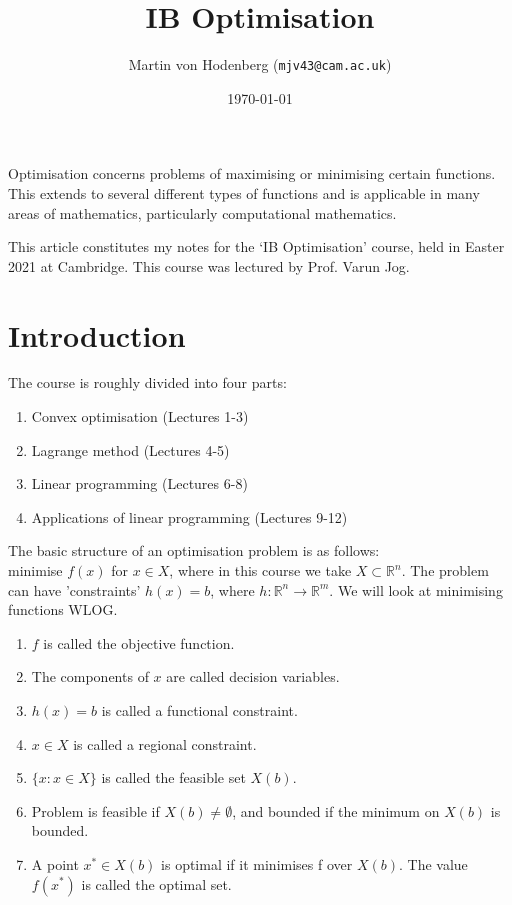 \documentclass[a4paper]{scrartcl}
\title{IB Optimisation}
\author{Martin von Hodenberg (\texttt{mjv43@cam.ac.uk})}
\date{\today}
\begin{document}
\maketitle

Optimisation concerns problems of maximising or minimising certain functions. This extends to several different types of functions and is applicable in many areas of mathematics, particularly computational mathematics.

This article constitutes my notes for the `IB Optimisation' course, held in Easter 2021 at Cambridge. This course was lectured by Prof. Varun Jog.

\tableofcontents
\newpage 

\section{Introduction}

The course is roughly divided into four parts:
\begin{enumerate}
	\item Convex optimisation (Lectures 1-3)
	\item Lagrange method (Lectures 4-5)
	\item Linear programming (Lectures 6-8)
	\item Applications of linear programming (Lectures 9-12)
\end{enumerate}

\begin{definition}
	The basic structure of an optimisation problem is as follows:\\
	minimise $f(x)$ for $x \in X$, where in this course we take $X \subset \mathbb{R}^n$. The problem can have 'constraints' $h(x)=b$, where $h:\mathbb{R}^n \to \mathbb{R}^m$. We will look at minimising functions WLOG.
	
	\begin{enumerate}
		\item $f$ is called the objective function.
		\item The components of $x$ are called decision variables.
		\item $h(x)=b$ is called a functional constraint.
		\item $x \in X$ is called a regional constraint.
		\item $\{x: x \in X\}$ is called the feasible set $X (b) $.
		\item Problem is feasible if $X(b)\neq \emptyset$, and bounded if the minimum on $X(b)$ is bounded.
		\item A point $x^* \in X(b)$ is optimal if it minimises f over $X(b)$. The value $f(x^*)$ is called the optimal set. 
	\end{enumerate}
	
\end{definition}
\end{document}

